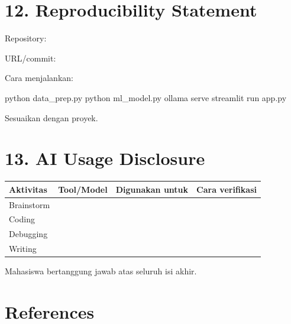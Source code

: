 \documentclass[
  indonesian,
  letterpaper,
  DIV=11,
  numbers=noendperiod]{scrreprt}
\newenvironment{Shaded}{\begin{snugshade}}{\end{snugshade}}
\newcommand{\ExtensionTok}[1]{\textcolor[rgb]{0.00,0.23,0.31}{#1}}
\newcommand{\NormalTok}[1]{\textcolor[rgb]{0.00,0.23,0.31}{#1}}
\newcounter{none} %
\begin{document}
\chapter{12. Reproducibility
Statement}\label{reproducibility-statement-1}

Repository:

\begin{Shaded}
\begin{Highlighting}[]
\NormalTok{URL/commit:}
\end{Highlighting}
\end{Shaded}

Cara menjalankan:

\begin{Shaded}
\begin{Highlighting}[]
\ExtensionTok{python}\NormalTok{ data\_prep.py}
\ExtensionTok{python}\NormalTok{ ml\_model.py}
\ExtensionTok{ollama}\NormalTok{ serve}
\ExtensionTok{streamlit}\NormalTok{ run app.py}
\end{Highlighting}
\end{Shaded}

Sesuaikan dengan proyek.

\chapter{13. AI Usage Disclosure}\label{ai-usage-disclosure}

{\def\LTcaptype{none} %
\begin{longtable}[]{@{}llll@{}}
\toprule\noalign{}
Aktivitas & Tool/Model & Digunakan untuk & Cara verifikasi \\
\midrule\noalign{}
\endhead
\bottomrule\noalign{}
\endlastfoot
Brainstorm & & & \\
Coding & & & \\
Debugging & & & \\
Writing & & & \\
\end{longtable}
}

Mahasiswa bertanggung jawab atas seluruh isi akhir.

\chapter*{References}\label{references}


\protect{}\label{refs}
\end{document}
